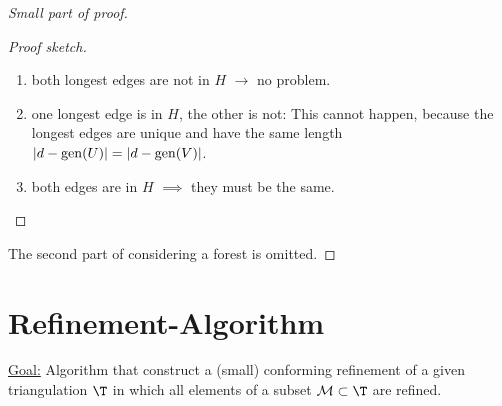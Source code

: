 \begin{proof}[Small part of proof]
\begin{proof}[Proof sketch]
\begin{itemize}
				\begin{enumerate}[label = Case \arabic*]
					\item both longest edges are not in $H$ $\to$ no problem.
					\item one longest edge is in $H$, the other is not:
						This cannot happen, because the longest edges are unique and have the same length $|d- \operatorname{gen}(U)|=|d-\operatorname{gen}(V)|$.
					\item both edges are in $H$ $\implies$ they must be the same. \qedhere
				\end{enumerate}
		\end{itemize} 
  \end{proof}
  The second part of considering a forest is omitted.
\end{proof}

\section{Refinement-Algorithm}
\underline{Goal:} Algorithm that construct a (small) conforming refinement of a given triangulation $\T$ in which all elements of a subset $\mathcal{M} \subset \T$ are refined.
